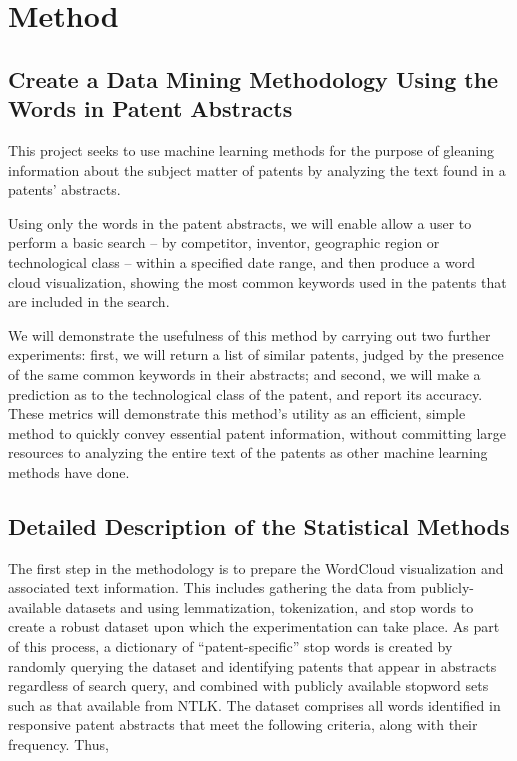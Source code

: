 \documentclass{article}
\begin{document}
\section{Method}
\label{method}

\subsection{Create a Data Mining Methodology Using the Words in Patent Abstracts}
This project seeks to use machine learning methods for the purpose of gleaning information about the subject matter of patents by analyzing the text found in a patents’ abstracts.  

Using only the words in the patent abstracts, we will enable allow a user to perform a basic search – by competitor, inventor, geographic region or technological class – within a specified date range, and then produce a word cloud visualization, showing the most common keywords used in the patents that are included in the search.  

We will demonstrate the usefulness of this method  by carrying out two further experiments: first, we will return a list of similar patents, judged by the presence of the same common keywords in their abstracts; and second, we will make a prediction as to the technological class of the patent, and report its accuracy.  These metrics will demonstrate this method’s utility as an efficient, simple method to quickly convey essential patent information, without committing large resources to analyzing the entire text of the patents as other machine learning methods have done.

\subsection{Detailed Description of the Statistical Methods}
The first step in the methodology is to prepare the WordCloud visualization and associated text information.  This includes gathering the data from publicly-available datasets and using lemmatization, tokenization, and stop words to create a robust dataset upon which the experimentation can take place.  As part of this process, a dictionary of “patent-specific” stop words is created by randomly querying the dataset and identifying patents that appear in abstracts regardless of search query, and combined with publicly available stopword sets such as that available from NTLK.  The dataset comprises all words identified in responsive patent abstracts that meet the following criteria, along with their frequency.  Thus,
\end{document}
